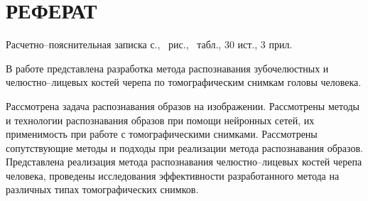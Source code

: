 \section*{РЕФЕРАТ}

Расчетно--пояснительная записка \pageref{LastPage} с., \totalfigures\ рис., \totaltables\ табл., 30 ист., 3 прил.

В работе представлена разработка метода распознавания зубочелюстных и челюстно--лицевых костей черепа по томографическим снимкам головы человека.

Рассмотрена задача распознавания образов на изображении. Рассмотрены методы и технологии распознавания образов при помощи нейронных сетей, их применимость при работе с томографическими снимками. Рассмотрены сопутствующие методы и подходы при реализации метода распознавания образов. Представлена реализация метода распознавания челюстно--лицевых костей черепа человека, проведены исследования эффективности разработанного метода на различных типах томографических снимков.